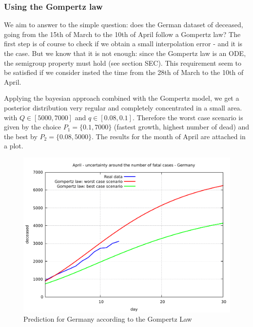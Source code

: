 \documentclass[9pt]{article}
\begin{document}
\subsubsection {Using the Gompertz law}
We aim to answer to the simple question: does the German dataset of deceased,
going from the 15th of March to the 10th of April follow a Gompertz law?
The first step is of course to check if we obtain a small interpolation
error - and it is the case. But we know that it is not enough: since
the Gompertz law is an ODE, the semigroup property must hold
(see section SEC). This requirement seem to be satisfied if we
consider insted the time from the 28th of March to the 10th of April.


Applying the bayesian approach combined with the Gompertz model,
we get a posterior distribution very regular and completely concentrated
in a small area. 
with $Q \in [5000,7000]$ and $q \in [0.08, 0.1]$. 
Therefore the worst case scenario is given by the choice 
$P_1 = \{0.1, 7000\}$ (fastest growth, highest
number of dead) and the best by $P_2 = \{0.08, 5000\}$. The results for the 
month of April are attached in a plot.

\begin{figure}
	\includegraphics[width=\linewidth]{de_gomp_dead.pdf}
  \caption{Prediction for Germany according to the Gompertz Law}
  \label{fig:boat1}
\end{figure}
\end{document}
